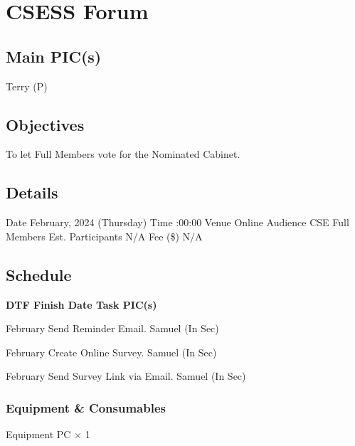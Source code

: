 \section{CSESS Forum}

\subsection{Main PIC(s)}
Terry (P)

\subsection{Objectives}
\startitemize
\item To let Full Members vote for the Nominated Cabinet.
\stopitemize

\subsection{Details}
\starttabulate[|rB|l|]
\NC Date
 February, 2024 (Thursday) \NR
\NC Time
:00:00 \NR
\NC Venue
\NC Online \NR
\NC Audience
\NC CSE Full Members \NR
\NC Est. Participants
\NC N/A \NR
\NC Fee (\$)
\NC N/A \NR
\stoptabulate

\subsection{Schedule}

\setupTABLE[c][1][width=0.75in]
\setupTABLE[c][2][width=1in]
\setupTABLE[c][3][width=3in]
\setupTABLE[c][4][width=1.25in]
\bTABLE
\bTABLEhead

\bTR\bTH    \bf{DTF}
\eTH\bTH    \bf{Finish Date}
\eTH\bTH    \bf{Task}
\eTH\bTH    \bf{PIC(s)}
\eTH\eTR

\eTABLEhead
\bTABLEbody

\bTR{}
\eTD{} February
\eTD\bTD Send Reminder Email.
\eTD\bTD Samuel (In Sec)
\eTD\eTR

\bTR{}
\eTD{} February
\eTD\bTD Create Online Survey.
\eTD\bTD Samuel (In Sec)
\eTD\eTR

\bTR{}
\eTD{} February
\eTD\bTD Send Survey Link via Email.
\eTD\bTD Samuel (In Sec)
\eTD\eTR

\eTABLEbody
\eTABLE

\subsubsection{Equipment \& Consumables}
\starttabulate[|l|l|]
\NC{}Equipment\NC\NR
\HL
\NC PC \NC $\times$ 1 \NR
\HL
\stoptabulate

\pagebreak
